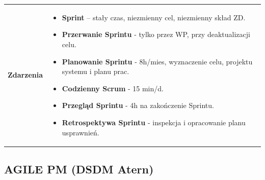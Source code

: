 \documentclass[a4paper]{article}
\begin{document}
\begin{table}[H]
\begin{center}
\begin{tabular}{ p{2.5cm} p{13.5cm}}
                \textbf{Zdarzenia}
                &
                \begin{itemize}
                    \item \textbf{Sprint} – stały czas, niezmienny cel, niezmienny skład ZD.
                    \item \textbf{Przerwanie Sprintu} - tylko przez WP, przy deaktualizacji celu.
                    \item \textbf{Planowanie Sprintu} - 8h/mies, wyznaczenie celu, projektu systemu i planu prac.
                    \item \textbf{Codzienny Scrum} - 15 min/d.
                    \item \textbf{Przegląd Sprintu} - 4h na zakończenie Sprintu.
                    \item \textbf{Retrospektywa Sprintu} - inspekcja i opracowanie planu usprawnień.
                \end{itemize}
            \end{tabular}
        \end{center}
    \end{table}


    \subsection{AGILE PM (DSDM Atern)}
\end{document}
